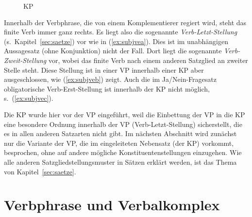 \begin{figure}
  \centering
  \caption{KP}
  \label{fig:substval}
\end{figure}


Innerhalb der Verbphrase, die von einem Komplementierer regiert wird, steht das finite Verb immer ganz rechts.
Es liegt also die sogenannte \textit{Verb-Letzt-Stellung} (s.\ Kapitel~\ref{sec:saetze}) vor wie in (\ref{ex:subjvea}).
Dies ist im unabhängigen Aussagesatz (ohne Konjunktion) nicht der Fall.
Dort liegt die sogenannte \textit{Verb-Zweit-Stellung} vor, wobei das finite Verb nach einem anderen Satzglied an zweiter Stelle steht.
Diese Stellung ist in einer VP innerhalb einer KP aber ausgeschlossen, wie (\ref{ex:subjveb}) zeigt.
Auch die im Ja\slash Nein-Fragesatz obligatorische Verb-Erst-Stellung ist innerhalb der KP nicht möglich, s.\ (\ref{ex:subjvec}).

\begin{exe}
  \ex\label{ex:subjve}
  \begin{xlist}
  \end{xlist}
\end{exe}

Die KP wurde hier vor der VP eingeführt, weil die Einbettung der VP in die KP eine besondere Ordnung innerhalb der VP (Verb-Letzt-Stellung) sicherstellt, die es in allen anderen Satzarten nicht gibt.
Im nächsten Abschnitt wird zunächst nur die Variante der VP, die im eingeleiteten Nebensatz (der KP) vorkommt, besprochen, ohne auf andere mögliche Konstituentenstellungen einzugehen.
Wie alle anderen Satzgliedstellungsmuster in Sätzen erklärt werden, ist das Thema von Kapitel~\ref{sec:saetze}.

\section{Verbphrase und Verbalkomplex}

